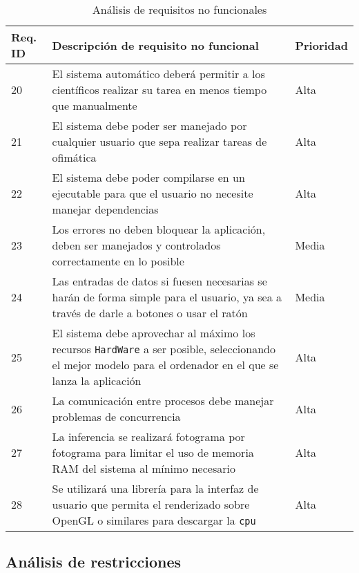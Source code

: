\begin{table}[H]
    \begin{center}
        \begin{tabular}{p{} | p{} p{}}
            Req. ID & Descripción de requisito no funcional & Prioridad\\
            \hline
            20& El sistema automático deberá permitir a los científicos realizar su tarea en menos tiempo que manualmente & Alta\\
            \hline
            21& El sistema debe poder ser manejado por cualquier usuario que sepa realizar tareas de ofimática & Alta\\
            \hline
            22& El sistema debe poder compilarse en un ejecutable para que el usuario no necesite manejar dependencias  & Alta\\
            \hline
            23& Los errores no deben bloquear la aplicación, deben ser manejados y controlados correctamente en lo posible & Media\\
            \hline
            24& Las entradas de datos si fuesen necesarias se harán de forma simple para el usuario, ya sea a través de darle a botones o usar el ratón & Media\\
            \hline
            25& El sistema debe aprovechar al máximo los recursos \texttt{HardWare} a ser posible, seleccionando el mejor modelo para el ordenador en el que se lanza la aplicación & Alta\\
            \hline
            26& La comunicación entre procesos debe manejar problemas de concurrencia & Alta\\
            \hline
            27& La inferencia se realizará fotograma por fotograma para limitar el uso de memoria RAM del sistema al mínimo necesario & Alta\\
            \hline
            28& Se utilizará una librería para la interfaz de usuario que permita el renderizado sobre OpenGL o similares para descargar la \texttt{\acrshort{cpu}} & Alta\\
            \hline
        \end{tabular} 
    \end{center}
    \caption{Análisis de requisitos no funcionales}
    \label{ReqNoFuncionales}
\end{table}

\clearpage

\subsection{Análisis de restricciones}

